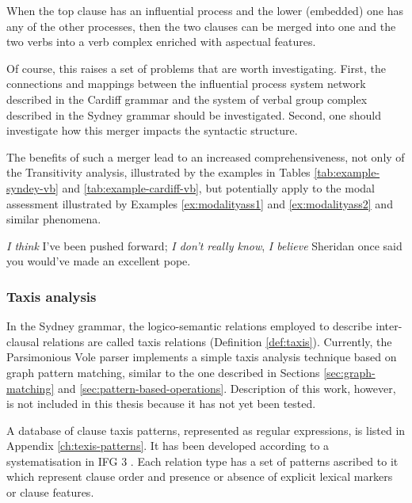     \begin{generalization} \label{def:merging-influential}
    	When the top clause has an influential process and the lower (embedded) one has any of the other processes, then the two clauses can be merged into one and the two verbs into a verb complex enriched with aspectual features.
    \end{generalization}
    
    Of course, this raises a set of problems that are worth investigating. First, the connections and mappings between the influential process system network described in the Cardiff grammar and the system of verbal group complex described in the Sydney grammar \citep[589]{Halliday2013} should be investigated. Second, one should investigate how this merger impacts the syntactic structure. 

    The benefits of such a merger lead to an increased comprehensiveness, not only of the Transitivity analysis, illustrated by the examples in Tables \ref{tab:example-syndey-vb} and \ref{tab:example-cardiff-vb}, but potentially apply to the modal assessment illustrated by Examples \ref{ex:modalityass1} and \ref{ex:modalityass2} and similar phenomena. 
    
    \begin{exe}
    	\ex\label{ex:modalityass1} \textit{I think} I've been pushed forward; \textit{I don't really know}, \citep[183]{Halliday2013}
    	\ex\label{ex:modalityass2} \textit{I believe} Sheridan once said you would've made an excellent pope. \citep[182]{Halliday2013}
    \end{exe}

\subsubsection{Taxis analysis}
    
    In the Sydney grammar, the logico-semantic relations employed to describe inter-clausal relations are called taxis relations (Definition \ref{def:taxis}). 
    Currently, the Parsimonious Vole parser implements a simple taxis analysis technique based on graph pattern matching, similar to the one described in Sections \ref{sec:graph-matching} and \ref{sec:pattern-based-operations}. %
    Description of this work, however, is not included in this thesis because it has not yet been tested.%

    A database of clause taxis patterns, represented as regular expressions, is listed in Appendix \ref{ch:texis-patterns}. It has been developed according to a systematisation in IFG 3 \citep{Halliday2004}. Each relation type has a set of patterns ascribed to it which represent clause order and presence or absence of explicit lexical markers or clause features. 

